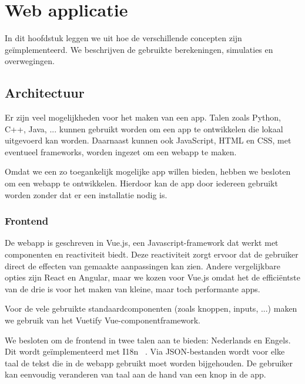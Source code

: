 \chapter{Web applicatie}\label{ch:implementatie}

In dit hoofdstuk leggen we uit hoe de verschillende concepten zijn ge\"implementeerd. We beschrijven de gebruikte berekeningen, simulaties en overwegingen.

\section{Architectuur}

Er zijn veel mogelijkheden voor het maken van een app. Talen zoals Python, C++, Java, ... kunnen gebruikt worden om een app te ontwikkelen die lokaal uitgevoerd kan worden. Daarnaast kunnen ook JavaScript, HTML en CSS, met eventueel frameworks, worden ingezet om een webapp te maken.

Omdat we een zo toegankelijk mogelijke app willen bieden, hebben we besloten om een webapp te ontwikkelen. Hierdoor kan de app door iedereen gebruikt worden zonder dat er een installatie nodig is. 



\subsection{Frontend}

De webapp is geschreven in Vue.js, een Javascript-framework dat werkt met componenten en reactiviteit biedt. Deze reactiviteit zorgt ervoor dat de gebruiker direct de effecten van gemaakte aanpassingen kan zien. Andere vergelijkbare opties zijn React en Angular, maar we kozen voor Vue.js omdat het de effici\"entste van de drie is voor het maken van kleine, maar toch performante apps.  

Voor de vele gebruikte standaardcomponenten (zoals knoppen, inputs, ...) maken we gebruik van het Vuetify Vue-componentframework.

We besloten om de frontend in twee talen aan te bieden: Nederlands en Engels. Dit wordt ge\"implementeerd met I18n ~\cite{krukowskiVue3I18n2023}. Via JSON-bestanden wordt voor elke taal de tekst die in de webapp gebruikt moet worden bijgehouden. De gebruiker kan eenvoudig veranderen van taal aan de hand van een knop in de app.

